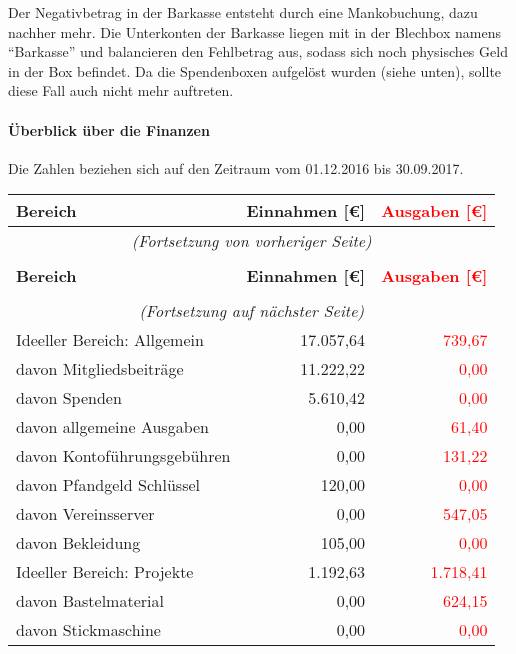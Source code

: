 \documentclass{s0minutes}
\begin{document}
Der Negativbetrag in der Barkasse entsteht durch eine Mankobuchung, dazu nachher
mehr. Die Unterkonten der Barkasse liegen mit in der Blechbox namens
"`Barkasse"' und balancieren den Fehlbetrag aus, sodass sich noch physisches
Geld in der Box befindet. Da die Spendenboxen aufgelöst wurden (siehe unten),
sollte diese Fall auch nicht mehr auftreten.

\paragraph{Überblick über die Finanzen}
Die Zahlen beziehen sich auf den Zeitraum vom 01.12.2016 bis 30.09.2017.

\begin{longtable}{lr>{\textcolor{red}\bgroup}r<{\egroup}}
  \textbf{Bereich} & \textbf{Einnahmen [€]} & \textbf{Ausgaben [€]} \\
  \midrule
  \endfirsthead
  \multicolumn{3}{c}{\emph{(Fortsetzung von vorheriger Seite)}} \\
  \\
  \textbf{Bereich} & \textbf{Einnahmen [€]} & \textbf{Ausgaben [€]} \\
  \midrule
  \endhead
  \\
  \multicolumn{3}{c}{\emph{(Fortsetzung auf nächster Seite)}} \\
  \endfoot
  \endlastfoot
  Ideeller Bereich: Allgemein       & 17{.}057{,}64 &       739{,}67 \\
  \quad davon Mitgliedsbeiträge     & 11{.}222{,}22 &         0{,}00 \\
  \quad davon Spenden               &  5{.}610{,}42 &         0{,}00 \\
  \quad davon allgemeine Ausgaben   &        0{,}00 &        61{,}40 \\
  \quad davon Kontoführungsgebühren &        0{,}00 &       131{,}22 \\
  \quad davon Pfandgeld Schlüssel   &      120{,}00 &         0{,}00 \\
  \quad davon Vereinsserver         &        0{,}00 &       547{,}05 \\
  \quad davon Bekleidung            &      105{,}00 &         0{,}00 \\
  \midrule
  Ideeller Bereich: Projekte        &  1{.}192{,}63 &   1{.}718{,}41 \\
  \quad davon Bastelmaterial        &        0{,}00 &       624{,}15 \\
  \quad davon Stickmaschine         &        0{,}00 &         0{,}00 \\

\end{longtable}
\end{document}

